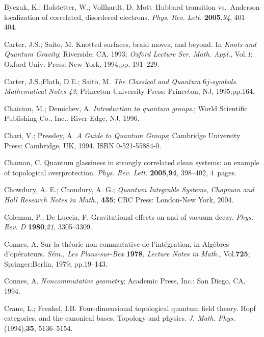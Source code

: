 \documentclass[12pt]{article}
\theoremstyle{plain}
\theoremstyle{definition}
\numberwithin{equation}{section}
\begin{document}
\begin{thebibliography}{199}

Byczuk, K.; Hofstetter, W.; Vollhardt, D.  Mott--Hubbard transition vs.\ Anderson localization of correlated, disordered electrons. \textit{Phys. Rev. Lett.} {\bf 2005},{\em 94}, 401--404. 

Carter, J.S.; Saito, M.  Knotted surfaces, braid moves, and beyond. In {\em Knots and Quantum Gravity}; Riverside, CA, 1993; \textit{Oxford Lecture Ser. Math. Appl.}, Vol.{\em 1}; Oxford Univ. Press: New York, 1994;pp. 191--229.

Carter, J.S.;Flath, D.E.; Saito, M. {\em The Classical and Quantum $6j$-symbols}. {\em Mathematical Notes 43}; Princeton University Press: Princeton, NJ, 1995;pp.164.

Chaician, M.;  Demichev, A. {\em  Introduction to quantum groups}.; World Scientific Publishing Co., Inc.: River Edge, NJ, 1996.

Chari, V.; Pressley, A. \emph{A Guide to Quantum Groups}; Cambridge University Press: Cambridge, UK, 1994. ISBN 0-521-55884-0.

Chamon, C.  Quantum glassiness in strongly correlated clean systems: an example of topological overprotection. \emph{Phys. Rev. Lett.} {\bf 2005},{\bf 94}, 
398--402, 4~pages.  


Chowdury, A. E.; Choudury, A. G.; \emph{Quantum Integrable Systems}, \emph{Chapman and Hall Research Notes in Math.},  {\bf 435}; CRC Press: London-New York, 2004.

Coleman, P.; De Luccia, F.  Gravitational effects on and of vacuum decay.  \emph{Phys. Rev. D} {\bf 1980},{\em 21}, 3305--3309.

Connes, A.  Sur la th\'eorie non-commutative de l'int\'egration, in Alg\`ebres d'op\'erateurs. \emph{S\'em., Les Plans-sur-Bex} {\bf 1978}, \emph{Lecture Notes in Math.}, Vol.{\bf 725}; Springer:Berlin, 1979; pp.19--143.

Connes, A.  \emph{ Noncommutative geometry}; Academic Press, Inc.: San Diego, CA, 1994.

Crane, L.; Frenkel, I.B. Four-dimensional topological quantum field theory. Hopf categories, and the canonical bases. Topology and physics. \emph{J. Math. Phys.}
(1994),{\bf 35}, 5136--5154.


\end{thebibliography}
\end{document}
